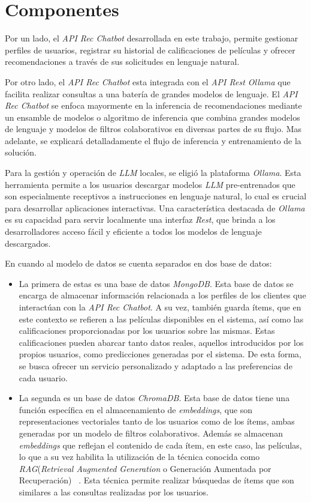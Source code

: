 \documentclass[11pt,a4paper,twoside]{thesis}
\begin{document}
\vfill
\section{Componentes}

Por un lado, el \textit{API Rec Chatbot} desarrollada en este trabajo, permite gestionar perfiles de usuarios, registrar su historial de calificaciones de películas y ofrecer recomendaciones a través de sus solicitudes en lenguaje natural.

Por otro lado, el \textit{API Rec Chatbot} esta integrada con el \textit{API Rest Ollama} que facilita realizar consultas a una batería de grandes modelos de lenguaje. El \textit{API Rec Chatbot} se enfoca mayormente en la inferencia de recomendaciones mediante un ensamble de modelos o algoritmo de inferencia que combina grandes modelos de lenguaje y modelos de filtros colaborativos en diversas partes de su flujo. Mas adelante, se explicará detalladamente el flujo de inferencia y entrenamiento de la solución.

Para la gestión y operación de \textit{LLM} locales, se eligió la plataforma \textit{Ollama}. Esta herramienta permite a los usuarios descargar modelos \textit{LLM} pre-entrenados que son especialmente receptivos a instrucciones en lenguaje natural, lo cual es crucial para desarrollar aplicaciones interactivas. Una característica destacada de \textit{Ollama} es su capacidad para servir localmente una interfaz \textit{Rest}, que brinda a los desarrolladores acceso fácil y eficiente a todos los modelos de lenguaje descargados.

En cuando al modelo de datos se cuenta separados en dos base de datos:
\begin{itemize}
	\item La primera de estas es una base de datos \textit{MongoDB}. Esta base de datos se encarga de almacenar información relacionada a los perfiles de los clientes que interactúan con la \textit{API Rec Chatbot}. A su vez, también guarda ítems, que en este contexto se refieren a las películas disponibles en el sistema, así como las calificaciones proporcionadas por los usuarios sobre las mismas. Estas calificaciones pueden abarcar tanto datos reales, aquellos introducidos por los propios usuarios, como predicciones generadas por el sistema. De esta forma, se busca ofrecer un servicio personalizado y adaptado a las preferencias de cada usuario.

	\item La segunda es un base de datos \textit{ChromaDB}. Esta base de datos tiene una función específica en el almacenamiento de \textit{embeddings}, que son representaciones vectoriales tanto de los usuarios como de los ítems, ambas generadas por un modelo de filtros colaborativos. Además se almacenan \textit{embeddings} que reflejan el contenido de cada ítem, en este caso, las películas, lo que a su vez habilita la utilización de la técnica conocida como \textit{RAG}(\textit{Retrieval Augmented Generation} o Generación Aumentada por Recuperación) ~\cite{rag}. Esta técnica permite realizar búsquedas de ítems que son similares a las consultas realizadas por los usuarios.
\end{itemize}
\end{document}
